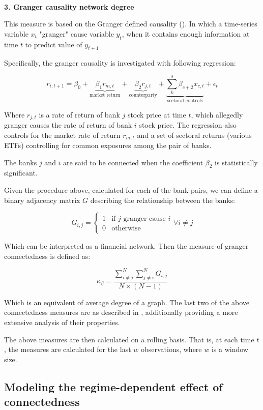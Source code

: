 \documentclass{article}
\begin{document}
\

\textbf{3. Granger causality network degree}

This measure is based on the Granger defined causality (\citet{granger}). In which a time-series variable $x_t$ "granger" cause variable $y_t$, when it contains enough information at time $t$ to predict value of $y_{t+1}$. 

Specifically, the granger causality is investigated with following regression:

\[r_{i,t+1} = \beta_0 + \underbrace{\beta_1 r_{m, t}}_{\text{market return}} + \underbrace{\beta_2 r_{j, t}}_{\text{counterparty}} + \underbrace{\sum_{k}^{s} \beta_{c+2} x_{c, t}}_{\text{sectoral controls}} + \epsilon_t\]

Where $r_{j, t}$ is a rate of return of bank $j$ stock price at time $t$, which allegedly granger causes the rate of return of bank $i$ stock price. The regression also controls for the market rate of return $r_{m, t}$ and a set of sectoral returns (various ETFs) controlling for common exposures among the pair of banks.

The banks $j$ and $i$ are said to be connected when the coefficient $\beta_2$ is statistically significant. 

Given the procedure above, calculated for each of the bank pairs, we can define a binary adjacency matrix $G$ describing the relationship between the banks:

\[G_{i,j} = \begin{cases}
    1  & \text{if } j \text{ granger cause } i \\
    0 & \text{otherwise}
  \end{cases} \forall i \neq j\]

Which can be interpreted as a financial network. Then the measure of granger connectedness is defined as:

\[\kappa_{\beta} = \frac{\sum_{i \neq j}^{N} \sum_{j \neq i}^{N} G_{i,j}}{ N \times (N-1)}\]

Which is an equivalent of average degree of a graph. The last two of the above connectedness measures are as described in \citet{billio}, additionally providing a more extensive analysis of their properties.

The above measures are then calculated on a rolling basis. That is, at each time $t$, the measures are calculated for the last $w$ observations, where $w$ is a window size. 

\subsection*{Modeling the regime-dependent effect of connectedness}
\end{document}
